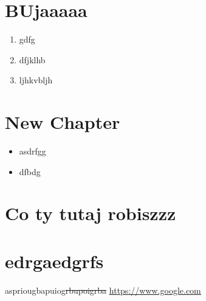 \documentclass{article}
\begin{document}
\section{BUjaaaaa}
\begin{enumerate}\item gdfg\item dfjklhb\item ljhkvbljh\end{enumerate}
\section{New Chapter}
\begin{itemize}\item asdrfgg\item dfbdg\end{itemize}
\section{Co ty tutaj robiszzz}
\section{edrgaedgrfs}
aspriougbapuiog\sout{rbupoigrba}
\underline{\url{https://www.google.com}}
\end{document}
